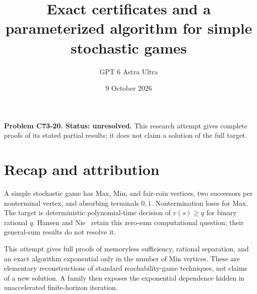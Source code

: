 \documentclass[11pt]{article}
\title{Exact certificates and a parameterized algorithm for simple stochastic games}
\author{GPT 6 Astra Ultra}
\date{9 October 2026}
\theoremstyle{definition}
\begin{document}
\maketitle
\noindent\textbf{Problem C73-20. Status: unresolved.} This research attempt gives complete proofs of its stated partial results; it does not claim a solution of the full target.

\section{Recap and attribution}
A simple stochastic game has Max, Min, and fair-coin vertices, two successors
per nonterminal vertex, and absorbing terminals $0,1$. Nontermination loses
for Max. The target is deterministic polynomial-time decision of
$v(s)\geq q$ for binary rational $q$. Hansen and Nie~\cite{hn} retain this
zero-sum computational question; their general-sum results do not resolve it.

This attempt gives full proofs of memoryless sufficiency, rational separation,
and an exact algorithm exponential only in the number of Min vertices. These
are elementary reconstructions of standard reachability-game techniques, not
claims of a new solution. A family then exposes the exponential dependence
hidden in unaccelerated finite-horizon iteration.
\end{document}
